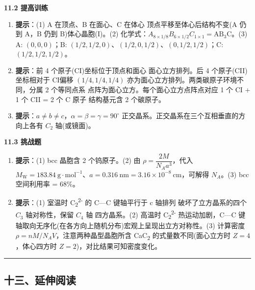 \textbf{11.2 提高训练}

\begin{enumerate}
\def\labelenumi{\arabic{enumi}.}
\setcounter{enumi}{3}
\item
  \textbf{提示}：(1) A 在顶点、B 在面心、C 在体心 \箭 顶点平移至体心后结构不变(A 仍到 A，B 仍到 B)\箭 体心晶胞(I)。(2) 化学式：\(A_{8\times 1/8} B_{6\times 1/2} C_{1\times 1} = \mathrm{AB_3C}\)。(3) A: \((0,0,0)\)；B: \((1/2,1/2,0)\)、\((1/2,0,1/2)\)、\((0,1/2,1/2)\)；C: \((1/2,1/2,1/2)\)。
\item
  \textbf{提示}：前 4 个原子(CI)坐标位于顶点和面心 \箭 面心立方排列。后 4 个原子(CII)坐标相对于 CI偏移 \((1/4, 1/4, 1/4)\) \箭 亦为面心立方排列。两类碳原子环境不同，分属 2 个等同点系 \箭 点阵为面心立方。每个面心立方点阵点对应 1 个 CI + 1 个 CII = 2 个 C 原子 \箭 结构基元含 2 个碳原子。
\item
  \textbf{提示}：\(a \neq b \neq c\)，\(\alpha = \beta = \gamma = 90^\circ\) \箭 正交晶系。正交晶系在三个互相垂直的方向上各有 \(C_2\) 轴(或镜面)。
\end{enumerate}

\textbf{11.3 挑战题}

\begin{enumerate}
\def\labelenumi{\arabic{enumi}.}
\setcounter{enumi}{6}
\item
  \textbf{提示}：(1) bcc 晶胞含 2 个钨原子。(2) 由 \(\rho = \dfrac{2M}{N_A a^3}\)，代入 \(M_{\mathrm{W}} = 183.84\ \mathrm{g\cdot mol^{-1}}\)、\(a = 0.316\ \mathrm{nm} = 3.16\times 10^{-8}\ \mathrm{cm}\)，可解得 \(N_A\)。(3) bcc 空间利用率 = 68\%。
\item
  \textbf{提示}：(1) 室温时 C\textsubscript{2}\textsuperscript{2-} 的 C---C 键轴平行于 c 轴排列 \箭 破坏了立方晶系的四个 \(C_3\) 轴对称性，保留 \(C_4\) 轴 \箭 四方晶系。(2) 高温时 C\textsubscript{2}\textsuperscript{2-} 热运动加剧，C---C 键轴取向无序化(在各方向上随机分布)\箭 宏观上呈现出立方对称性。(3) 计算密度 \(\rho = nM/N_A V\)，注意两种晶型晶胞所含 CaC\textsubscript{2} 的式量数不同(面心立方时 \(Z = 4\)，体心四方时 \(Z = 2\))，对比结果可知密度变化。
\end{enumerate}

\begin{center}\rule{0.5\linewidth}{0.5pt}\end{center}

\subsection{十三、延伸阅读}\label{ux5341ux4e09ux5ef6ux4f38ux9605ux8bfb}

